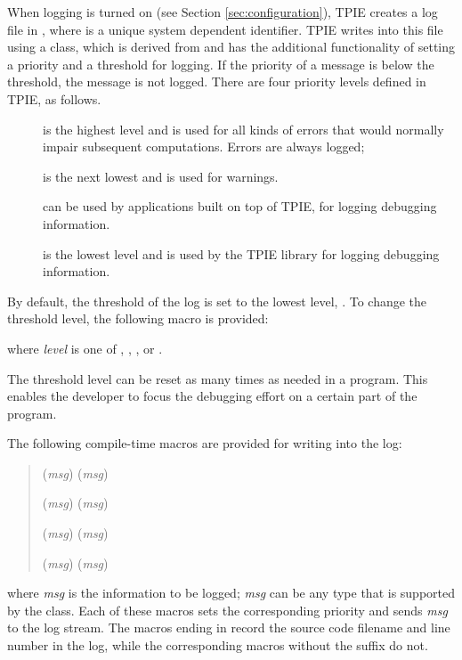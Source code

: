 When logging is turned on (see Section \ref{sec:configuration}), TPIE
creates a log file in , where
 is a unique system dependent identifier. TPIE writes into
this file using a  class, which is derived from
 and has the additional functionality of setting a priority
and a threshold for logging. If the priority of a message is below
 the threshold, the message is not logged. There are four priority
levels defined in TPIE, as follows.
\begin{description}
    \item[] is the highest level and
    is used for all kinds of errors that would normally
    impair subsequent computations. Errors are always
    logged;
    \item[] is the next lowest and
    is used for warnings.
    \item[] can be used by
    applications built on top of TPIE, for logging debugging
    information.
    \item[] is the lowest level
    and is used by the TPIE library for logging debugging
    information.
\end{description}
By default, the threshold of the log is set to the lowest
level, . To change the
threshold level, the following macro is provided:
\begin{quote}
    \myverb{)}
\end{quote}
where \emph{level} is one of ,
, , or
.

The threshold level can be reset as many times as needed in
a program. This enables the developer to focus the debugging
effort on a certain part of the program.

The following compile-time macros are provided for writing
into the log:
\begin{quote}
({\em msg})
({\em msg})

({\em msg})
({\em msg})

({\em msg})
({\em msg})

({\em msg})
({\em msg})
\end{quote}
where {\em msg} is the information to be logged; {\em msg} can be any type
that is supported by the   class. Each of these
macros sets the corresponding priority and sends {\em msg} to the log
stream. The macros ending in  record the source
code filename and line number in the log, while the
corresponding macros without the  suffix do not.

